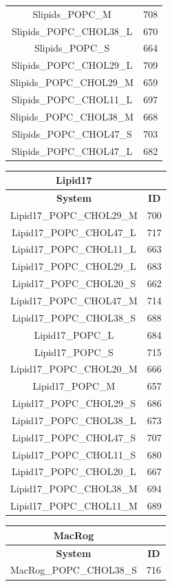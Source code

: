 \documentclass[journal=jpcbfk]{achemso}
\begin{document}
\begin{table}[]
\begin{tabular}{cc}
Slipids\_POPC\_M  &  708 \\ 
Slipids\_POPC\_CHOL38\_L  &  670 \\ 
Slipids\_POPC\_S  &  664 \\ 
Slipids\_POPC\_CHOL29\_L  &  709 \\ 
Slipids\_POPC\_CHOL29\_M  &  659 \\ 
Slipids\_POPC\_CHOL11\_L  &  697 \\ 
Slipids\_POPC\_CHOL38\_M  &  668 \\ 
Slipids\_POPC\_CHOL47\_S  &  703 \\ 
Slipids\_POPC\_CHOL47\_L  &  682 \\
\end{tabular}
\quad
\begin{tabular}{cc}
\textbf{Lipid17} \\
\toprule
\textbf{System} & \textbf{ID} \\
\midrule
Lipid17\_POPC\_CHOL29\_M  &  700 \\ 
Lipid17\_POPC\_CHOL47\_L  &  717 \\ 
Lipid17\_POPC\_CHOL11\_L  &  663 \\ 
Lipid17\_POPC\_CHOL29\_L  &  683 \\ 
Lipid17\_POPC\_CHOL20\_S  &  662 \\ 
Lipid17\_POPC\_CHOL47\_M  &  714 \\ 
Lipid17\_POPC\_CHOL38\_S  &  688 \\ 
Lipid17\_POPC\_L  &  684 \\ 
Lipid17\_POPC\_S  &  715 \\ 
Lipid17\_POPC\_CHOL20\_M  &  666 \\ 
Lipid17\_POPC\_M  &  657 \\ 
Lipid17\_POPC\_CHOL29\_S  &  686 \\ 
Lipid17\_POPC\_CHOL38\_L  &  673 \\ 
Lipid17\_POPC\_CHOL47\_S  &  707 \\ 
Lipid17\_POPC\_CHOL11\_S  &  680 \\ 
Lipid17\_POPC\_CHOL20\_L  &  667 \\ 
Lipid17\_POPC\_CHOL38\_M  &  694 \\ 
Lipid17\_POPC\_CHOL11\_M  &  689 \\
\end{tabular}
\quad
\begin{tabular}{cc}
\textbf{MacRog} \\
\toprule
\textbf{System} & \textbf{ID} \\
\midrule
MacRog\_POPC\_CHOL38\_S  &  716 \\ 

\end{tabular}
\end{table}
\end{document}
